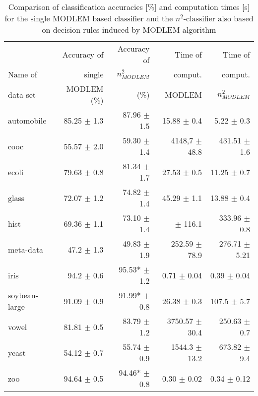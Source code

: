 \documentclass{llncs}
\begin{document}
\begin{table}
\label{n2class} \centering \caption{Comparison of classification accuracies
[\%] and computation times [s] for the single MODLEM based classifier and
the $n^2$-classifier also based on decision rules induced by MODLEM
algorithm}
\begin{tabular}{lrrrr}
\hline\noalign{\smallskip}
  & Accuracy of &\quad Accuracy of &\quad
Time of &\quad Time of \\ Name of  & single &\quad $n^2_{MODLEM}$ &\quad
comput. & comput. \\ data set
 & MODLEM  (\%) &(\%) \quad & \quad MODLEM & \quad $n^2_{MODLEM}$ \\
 \hline
 automobile & 85.25 \scriptsize{$\pm$ 1.3} & 87.96 \scriptsize{$\pm$ 1.5}
& 15.88 \scriptsize{$\pm$ 0.4}& 5.22 \scriptsize{$\pm$ 0.3} \\ cooc & 55.57
\scriptsize{$\pm$ 2.0} & 59.30 \scriptsize{$\pm$ 1.4} & 4148,7
\scriptsize{$\pm$ 48.8} & 431.51 \scriptsize{$\pm$ 1.6} \\  ecoli & 79.63
\scriptsize{$\pm$  0.8} & 81.34 \scriptsize{$\pm$ 1.7} & 27.53
\scriptsize{$\pm$ 0.5} & 11.25 \scriptsize{$\pm$ 0.7}\\  glass & 72.07
\scriptsize{$\pm$  1.2} & 74.82 \scriptsize{$\pm$ 1.4} & 45.29
\scriptsize{$\pm$ 1.1} & 13.88 \scriptsize{$\pm$ 0.4} \\  hist & 69.36
\scriptsize{$\pm$  1.1} & 73.10 \scriptsize{$\pm$ 1.4} & \quad 3563.79
\scriptsize{$\pm$ 116.1} & 333.96 \scriptsize{$\pm$ 0.8} \\ meta-data & 47.2
\scriptsize{$\pm$ 1.3} & 49.83 \scriptsize{$\pm$ 1.9} & 252.59
\scriptsize{$\pm$ 78.9} & 276.71 \scriptsize{$\pm$ 5.21} \\  iris & 94.2
\scriptsize{$\pm$ 0.6 }& 95.53* \scriptsize{$\pm$ 1.2} & 0.71
\scriptsize{$\pm$ 0.04 } &  0.39 \scriptsize{$\pm$ 0.04} \\ soybean-large &
91.09 \scriptsize{$\pm$ 0.9 }& 91.99* \scriptsize{$\pm$ 0.8} & 26.38
\scriptsize{$\pm$ 0.3} & 107.5 \scriptsize{$\pm$ 5.7} \\  vowel & 81.81
\scriptsize{$\pm$ 0.5} & 83.79 \scriptsize{$\pm$ 1.2} & 3750.57
\scriptsize{$\pm$ 30.4} & 250.63 \scriptsize{$\pm$ 0.7} \\  yeast & 54.12
\scriptsize{$\pm$ 0.7} & 55.74 \scriptsize{$\pm$ 0.9} &  1544.3
\scriptsize{$\pm$ 13.2} & 673.82 \scriptsize{$\pm$ 9.4}\\ zoo & 94.64
\scriptsize{$\pm$ 0.5} & 94.46* \scriptsize{$\pm$ 0.8} & 0.30
\scriptsize{$\pm$ 0.02} & 0.34 \scriptsize{$\pm$ 0.12} \\ \hline
\end{tabular}
\end{table}
\end{document}
